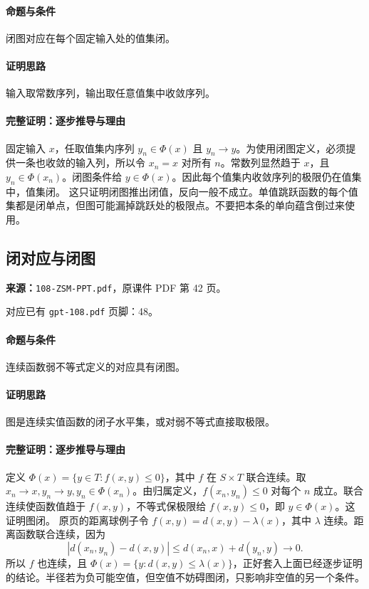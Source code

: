 \paragraph{命题与条件}闭图对应在每个固定输入处的值集闭。
\paragraph{证明思路}输入取常数序列，输出取任意值集中收敛序列。
\paragraph{完整证明：逐步推导与理由}

固定输入 $x$，任取值集内序列 $y_n\in\Phi(x)$ 且 $y_n\to y$。为使用闭图定义，必须提供一条也收敛的输入列，所以令 $x_n=x$ 对所有 $n$。常数列显然趋于 $x$，且 $y_n\in\Phi(x_n)$。闭图条件给 $y\in\Phi(x)$。因此每个值集内收敛序列的极限仍在值集中，值集闭。
这只证明闭图推出闭值，反向一般不成立。单值跳跃函数的每个值集都是闭单点，但图可能漏掉跳跃处的极限点。不要把本条的单向蕴含倒过来使用。

\clearpage\subsection{闭对应与闭图}
\textbf{来源：}\texttt{108-ZSM-PPT.pdf}，原课件 PDF 第 42 页。\par
对应已有 \texttt{gpt-108.pdf} 页脚：48。\par
\paragraph{命题与条件}连续函数弱不等式定义的对应具有闭图。
\paragraph{证明思路}图是连续实值函数的闭子水平集，或对弱不等式直接取极限。
\paragraph{完整证明：逐步推导与理由}

定义 $\Phi(x)=\{y\in T:f(x,y)\le0\}$，其中 $f$ 在 $S\times T$ 联合连续。取 $x_n\to x,y_n\to y,y_n\in\Phi(x_n)$。由归属定义，$f(x_n,y_n)\le0$ 对每个 $n$ 成立。联合连续使函数值趋于 $f(x,y)$，不等式保极限给 $f(x,y)\le0$，即 $y\in\Phi(x)$。这证明图闭。
原页的距离球例子令 $f(x,y)=d(x,y)-\lambda(x)$，其中 $\lambda$ 连续。距离函数联合连续，因为
\[|d(x_n,y_n)-d(x,y)|\le d(x_n,x)+d(y_n,y)\to0.\]
所以 $f$ 也连续，且 $\Phi(x)=\{y:d(x,y)\le\lambda(x)\}$，正好套入上面已经逐步证明的结论。半径若为负可能空值，但空值不妨碍图闭，只影响非空值的另一个条件。


